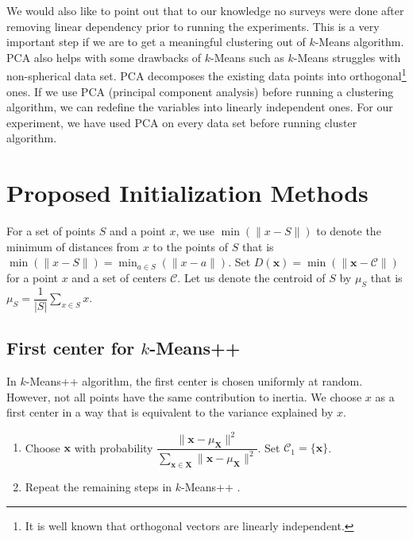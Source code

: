 \documentclass[twoside, 11pt]{article}
\newcommand{\x}{\mathbf{x}}
\newcommand{\X}{\mathbf{X}}
\newcommand{\C}{\mathcal{C}}
\begin{document}
	We would also like to point out that to our knowledge no surveys were done after removing linear dependency prior to running the experiments. This is a very important step if we are to get a meaningful clustering out of $k$-Means algorithm. PCA also helps with some drawbacks of $k$-Means such as $k$-Means struggles with non-spherical data set. PCA decomposes the existing data points into orthogonal\footnote{It is well known that orthogonal vectors are linearly independent.} ones. If we use PCA (principal component analysis) before running a clustering algorithm, we can redefine the variables into linearly independent ones. For our experiment, we have used PCA on every data set before running cluster algorithm.
	\section{Proposed Initialization Methods}
	For a set of points $S$ and a point $x$, we use $\min(\|x-S\|)$ to denote the minimum of distances from $x$ to the points of $S$ that is $\min(\| x-S\|)=\min_{a\in S}(\| x-a\|)$. Set $D(\x)=\min(\|\x-\C\|)$ for a point $x$ and a set of centers $\C$. Let us denote the centroid of $S$ by $\mu_S$ that is $\mu_S=\dfrac{1}{|S|}\sum_{x\in S}x$.
	\subsection{First center for $k$-Means++}\label{sec:first_center}
	In $k$-Means++ algorithm, the first center is chosen uniformly at random. However, not all points have the same contribution to inertia. We choose $x$ as a first center in a way that is equivalent to the variance explained by $x$.
	\begin{enumerate}[i]
		\item Choose $\x$ with probability $\dfrac{\|\x-\mu_{\X}\|^2}{\sum_{\x\in\X}\|\x-\mu_{\X}\|^2}$. Set $\C_1=\{\x\}$.\label{step:first_center}
		\item Repeat the remaining steps in $k$-Means++ \cite[Section $2.2$, Page $3$]{kmeans++}.
	\end{enumerate}
\end{document}
